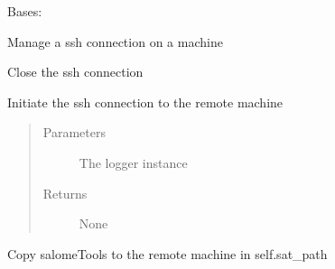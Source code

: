 \documentclass[a4paper,10pt,english]{sphinxmanual}
\begin{document}
\begin{fulllineitems}
\label{\detokenize{apidoc_commands/commands:commands.jobs.Machine}}
Bases: 

Manage a ssh connection on a machine

\begin{fulllineitems}
\label{\detokenize{apidoc_commands/commands:commands.jobs.Machine.close}}
Close the ssh connection

\end{fulllineitems}


\begin{fulllineitems}
\label{\detokenize{apidoc_commands/commands:commands.jobs.Machine.connect}}
Initiate the ssh connection to the remote machine
\begin{quote}\begin{description}
\item[{Parameters}] \leavevmode
{} \textendash{} The logger instance

\item[{Returns}] \leavevmode
None

\end{description}\end{quote}

\end{fulllineitems}


\begin{fulllineitems}
\label{\detokenize{apidoc_commands/commands:commands.jobs.Machine.copy_sat}}
Copy salomeTools to the remote machine in self.sat\_path

\end{fulllineitems}



\end{fulllineitems}
\end{document}

